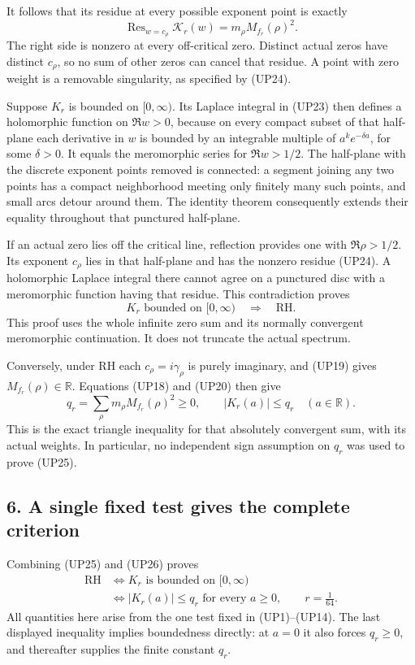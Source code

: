\documentclass[
  10pt,
  a4paper,
]{article}
\begin{document}
It follows that its residue at every possible exponent point is exactly
\[
\operatorname{Res}_{w=c_\rho}\mathscr K_r(w)
=m_\rho M_{f_r}(\rho)^2.
\tag{UP24}
\] The right side is nonzero at every off-critical zero. Distinct actual
zeros have distinct \(c_\rho\), so no sum of other zeros can cancel that
residue. A point with zero weight is a removable singularity, as
specified by (UP24).

Suppose \(K_r\) is bounded on \([0,\infty)\). Its Laplace integral in
(UP23) then defines a holomorphic function on \(\Re w>0\), because on
every compact subset of that half-plane each derivative in \(w\) is
bounded by an integrable multiple of \(a^ke^{-\delta a}\), for some
\(\delta>0\). It equals the meromorphic series for \(\Re w>1/2\). The
half-plane with the discrete exponent points removed is connected: a
segment joining any two points has a compact neighborhood meeting only
finitely many such points, and small arcs detour around them. The
identity theorem consequently extends their equality throughout that
punctured half-plane.

If an actual zero lies off the critical line, reflection provides one
with \(\Re\rho>1/2\). Its exponent \(c_\rho\) lies in that half-plane
and has the nonzero residue (UP24). A holomorphic Laplace integral there
cannot agree on a punctured disc with a meromorphic function having that
residue. This contradiction proves \[
K_r\text{ bounded on }[0,\infty)
\quad\Longrightarrow\quad\mathrm{RH}.
\tag{UP25}
\] This proof uses the whole infinite zero sum and its normally
convergent meromorphic continuation. It does not truncate the actual
spectrum.

Conversely, under RH each \(c_\rho=i\gamma_\rho\) is purely imaginary,
and (UP19) gives \(M_{f_r}(\rho)\in\mathbb R\). Equations (UP18) and
(UP20) then give \[
q_r=\sum_\rho m_\rho M_{f_r}(\rho)^2\ge0,
\qquad |K_r(a)|\le q_r\quad(a\in\mathbb R).
\tag{UP26}
\] This is the exact triangle inequality for that absolutely convergent
sum, with its actual weights. In particular, no independent sign
assumption on \(q_r\) was used to prove (UP25).

\subsection{6. A single fixed test gives the complete
criterion}\label{a-single-fixed-test-gives-the-complete-criterion}

Combining (UP25) and (UP26) proves \[
\boxed{
\begin{split}
\mathrm{RH}
&\Longleftrightarrow K_r\text{ is bounded on }[0,\infty)\\
&\Longleftrightarrow |K_r(a)|\le q_r\text{ for every }a\ge0,
\qquad r=\frac1{64}.
\end{split}}
\tag{UP27}
\] All quantities here arise from the one test fixed in (UP1)--(UP14).
The last displayed inequality implies boundedness directly: at \(a=0\)
it also forces \(q_r\ge0\), and thereafter supplies the finite constant
\(q_r\).
\end{document}
